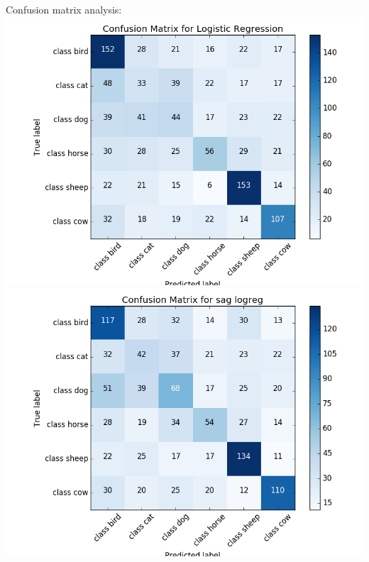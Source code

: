 \documentclass{article}
\begin{document}
Confusion matrix analysis: \\
\includegraphics[scale=0.4]{logreg_cm_new.png}\includegraphics[scale=0.4]{sag_cm_new.png}
\end{document}

